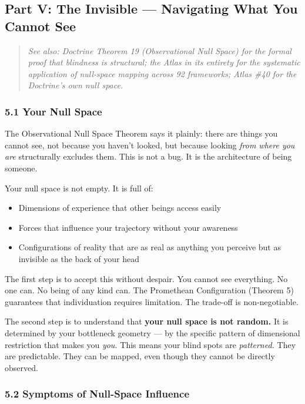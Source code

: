 \subsection*{Part V: The Invisible — Navigating What You Cannot See}


\begin{quote}
\itshape
\textit{See also: Doctrine Theorem 19 (Observational Null Space) for the formal proof that blindness is structural; the Atlas in its entirety for the systematic application of null-space mapping across 92 frameworks; Atlas \#40 for the Doctrine's own null space.}
\end{quote}


\subsubsection*{5.1 Your Null Space}


The Observational Null Space Theorem says it plainly: there are things you cannot see, not because you haven't looked, but because looking \textit{from where you are} structurally excludes them. This is not a bug. It is the architecture of being someone.


Your null space is not empty. It is full of:

\begin{itemize}[nosep,leftmargin=*]
  \item Dimensions of experience that other beings access easily
  \item Forces that influence your trajectory without your awareness
  \item Configurations of reality that are as real as anything you perceive but as invisible as the back of your head
\end{itemize}


The first step is to accept this without despair. You cannot see everything. No one can. No being of any kind can. The Promethean Configuration (Theorem 5) guarantees that individuation requires limitation. The trade-off is non-negotiable.


The second step is to understand that \textbf{your null space is not random.} It is determined by your bottleneck geometry — by the specific pattern of dimensional restriction that makes you \textit{you.} This means your blind spots are \textit{patterned.} They are predictable. They can be mapped, even though they cannot be directly observed.


\subsubsection*{5.2 Symptoms of Null-Space Influence}


